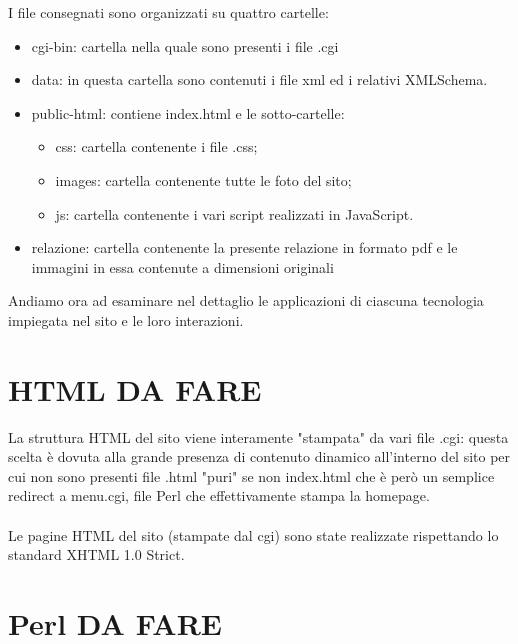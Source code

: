 \documentclass[12pt]{article}
\begin{document}
			 I file consegnati sono organizzati su quattro cartelle:
			\begin{itemize}
				\item cgi-bin: cartella nella quale sono presenti i file .cgi
				\item data: in questa cartella sono contenuti i file xml ed i relativi XMLSchema.
				\item public-html: contiene index.html e le sotto-cartelle:
\begin{itemize}
\item css: cartella contenente i file .css;
		\item		 images: cartella contenente tutte le foto del sito;
			\item	 js: cartella contenente i vari script realizzati in JavaScript.
\end{itemize}		
\item relazione: cartella contenente la presente relazione in formato pdf e le immagini in essa contenute a dimensioni originali		 
			\end{itemize}	Andiamo ora ad esaminare nel dettaglio le applicazioni di ciascuna tecnologia impiegata nel sito e le loro interazioni. 
			
			\newpage
			\section{HTML DA FARE}

 La struttura HTML del sito viene interamente "stampata" da vari file .cgi: questa scelta \`e dovuta alla grande presenza di contenuto dinamico all'interno del sito per cui non sono presenti file .html "puri" se non index.html che \`e per\`o un semplice redirect a menu.cgi, file Perl che effettivamente stampa la homepage. \\ \\
Le pagine HTML del sito (stampate dal cgi) sono state realizzate rispettando lo standard XHTML 1.0 Strict.


			\section{Perl DA FARE}
			
\end{document}

